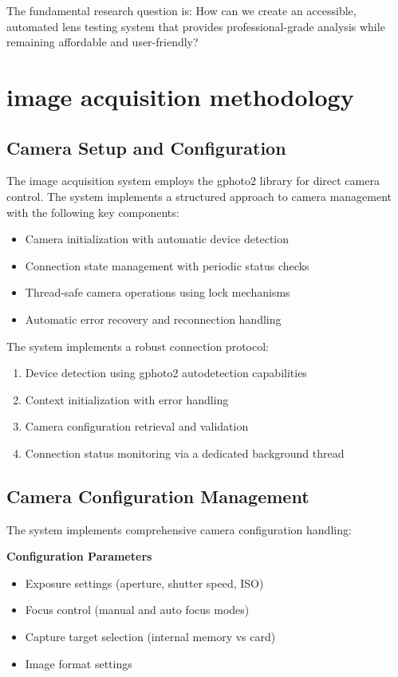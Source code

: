 The fundamental research question is: How can we create an accessible, automated lens testing system that provides professional-grade analysis while remaining affordable and user-friendly?


\section{image acquisition methodology}
\subsection{Camera Setup and Configuration}
The image acquisition system employs the gphoto2 library for direct camera control. The system implements a structured approach to camera management with the following key components:

\begin{itemize}
    \item Camera initialization with automatic device detection
    \item Connection state management with periodic status checks
    \item Thread-safe camera operations using lock mechanisms
    \item Automatic error recovery and reconnection handling
\end{itemize}

The system implements a robust connection protocol:
\begin{enumerate}
    \item Device detection using gphoto2 autodetection capabilities
    \item Context initialization with error handling
    \item Camera configuration retrieval and validation
    \item Connection status monitoring via a dedicated background thread
\end{enumerate}

\subsection{Camera Configuration Management}
The system implements comprehensive camera configuration handling:

\textbf{Configuration Parameters}
\begin{itemize}
    \item Exposure settings (aperture, shutter speed, ISO)
    \item Focus control (manual and auto focus modes)
    \item Capture target selection (internal memory vs card)
    \item Image format settings
\end{itemize}

